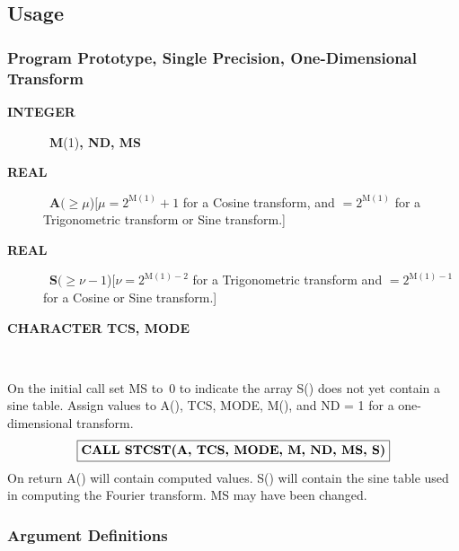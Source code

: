 \documentclass[twoside]{MATH77}
\begin{document}
\subsection{Usage}

\subsubsection{Program Prototype, Single Precision, One-Dimensional Transform}

\begin{description}
\item[\bf INTEGER]  \ {\bf M}(1){\bf , ND, MS}
\item[\bf REAL]  \ {\bf A}$(\geq \mu $)\quad $[\mu =2^{\text{M}(1)}+1$
for a Cosine transform, and $=2^{\text{M}(1)}$ for a Trigonometric transform or
Sine transform.]
\item[\bf REAL]  \ {\bf S}$(\geq \nu {-}1$)\quad $[\nu =2^{\text{M}(1)-2}$ for
a Trigonometric transform and $=2^{\text{M}(1)-1}$ for a Cosine or Sine
transform.]
\item[\bf CHARACTER TCS, MODE]  \
\end{description}

On the initial call set MS to~0 to indicate the array S() does not yet
contain a sine table. Assign values to A(), TCS, MODE, M(), and ND = 1
for a one-dimensional transform.
$$
\fbox{{\bf CALL STCST(A, TCS, MODE, M, ND, MS, S)}}
$$
On return A() will contain computed values. S() will contain the sine
table used in computing the Fourier transform. MS may have been changed.

\subsubsection{Argument Definitions}
\end{document}
